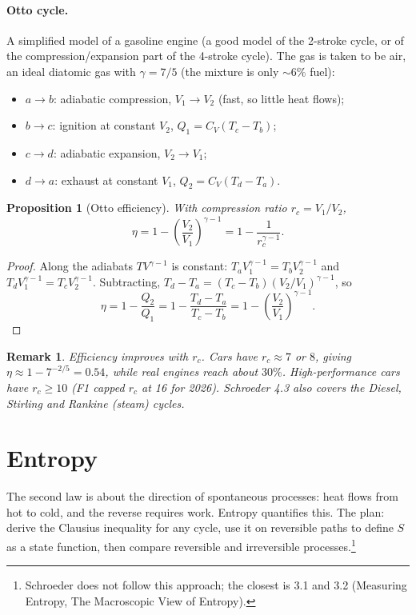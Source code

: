 \documentclass{article}
\newtheorem{remark}{Remark}
\newtheorem{proposition}{Proposition}
\begin{document}
\paragraph{Otto cycle.}
A simplified model of a gasoline engine (a good model of the 2-stroke cycle, or of the compression/expansion part of the 4-stroke cycle). The gas is taken to be air, an ideal diatomic gas with $\gamma = 7/5$ (the mixture is only $\sim 6\%$ fuel):
\begin{itemize}
    \item $a \to b$: adiabatic compression, $V_1 \to V_2$ (fast, so little heat flows);
    \item $b \to c$: ignition at constant $V_2$, $Q_1 = C_V(T_c - T_b)$;
    \item $c \to d$: adiabatic expansion, $V_2 \to V_1$;
    \item $d \to a$: exhaust at constant $V_1$, $Q_2 = C_V(T_d - T_a)$.
\end{itemize}

\begin{proposition}[Otto efficiency]
    With compression ratio $r_c = V_1/V_2$,
    \[\eta = 1 - \left(\frac{V_2}{V_1}\right)^{\gamma - 1} = 1 - \frac{1}{r_c^{\gamma - 1}}.\]
\end{proposition}
\begin{proof}
    Along the adiabats $TV^{\gamma-1}$ is constant: $T_a V_1^{\gamma-1} = T_b V_2^{\gamma-1}$ and $T_d V_1^{\gamma-1} = T_c V_2^{\gamma-1}$. Subtracting, $T_d - T_a = (T_c - T_b)(V_2/V_1)^{\gamma-1}$, so
    \[\eta = 1 - \frac{Q_2}{Q_1} = 1 - \frac{T_d - T_a}{T_c - T_b} = 1 - \left(\frac{V_2}{V_1}\right)^{\gamma - 1}.\]
\end{proof}

\begin{remark}
    Efficiency improves with $r_c$. Cars have $r_c \approx 7$ or $8$, giving $\eta \approx 1 - 7^{-2/5} = 0.54$, while real engines reach about $30\%$. High-performance cars have $r_c \geq 10$ (F1 capped $r_c$ at 16 for 2026). Schroeder 4.3 also covers the Diesel, Stirling and Rankine (steam) cycles.
\end{remark}

\section{Entropy}
The second law is about the direction of spontaneous processes: heat flows from hot to cold, and the reverse requires work. Entropy quantifies this. The plan: derive the Clausius inequality for any cycle, use it on reversible paths to define $S$ as a state function, then compare reversible and irreversible processes.\footnote{Schroeder does not follow this approach; the closest is 3.1 and 3.2 (Measuring Entropy, The Macroscopic View of Entropy).}
\end{document}
